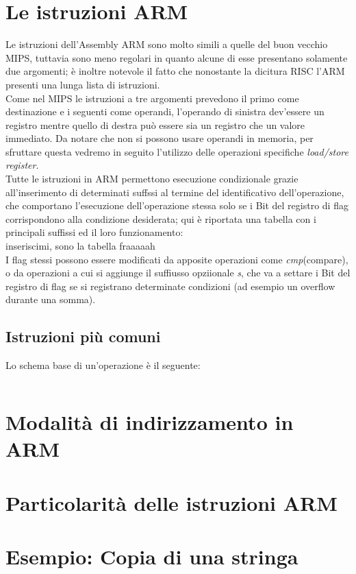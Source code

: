 \documentclass[class=book, crop=false]{standalone}
\begin{document}
\section{Le istruzioni ARM}
Le istruzioni dell'Assembly ARM sono molto simili a quelle del buon vecchio MIPS, tuttavia sono meno regolari in quanto alcune di esse presentano solamente due argomenti; è inoltre notevole il fatto che nonostante la dicitura RISC l'ARM presenti una lunga lista di istruzioni.\\
Come nel MIPS le istruzioni a tre argomenti prevedono il primo come destinazione e i seguenti come operandi, l'operando di sinistra dev'essere un registro mentre quello di destra può essere sia un registro che un valore immediato. Da notare che non si possono usare operandi in memoria, per sfruttare questa vedremo in seguito l'utilizzo delle operazioni specifiche \emph{load/store register}.\\
Tutte le istruzioni in ARM permettono esecuzione condizionale grazie all'inserimento di determinati suffssi al termine del identificativo dell'operazione, che comportano l'esecuzione dell'operazione stessa solo se i Bit del registro di flag corrispondono alla condizione desiderata; qui è riportata una tabella con i principali suffissi ed il loro funzionamento:\\
inseriscimi, sono la tabella fraaaaah\\
I flag stessi possono essere modificati da apposite operazioni come \emph{cmp}(compare), o da operazioni a cui si aggiunge il suffiusso opziionale \emph{s}, che va a settare i Bit del registro di flag se si registrano determinate condizioni (ad esempio un overflow durante una somma).\\

\subsection*{Istruzioni più comuni}
Lo schema base di un'operazione è il seguente:
\begin{verbatim}

\end{verbatim}


\section{Modalità di indirizzamento in ARM}


\section{Particolarità delle istruzioni ARM}
\section{Esempio: Copia di una stringa}
\end{document}
